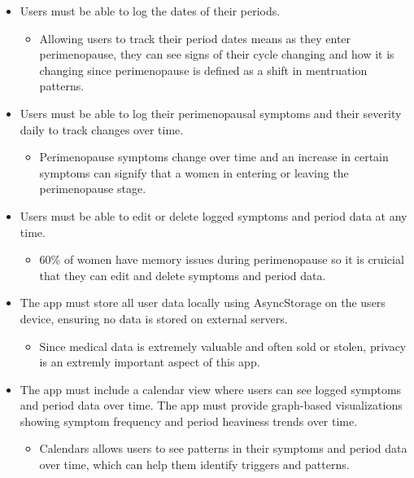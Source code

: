 \begin{itemize}
      \item Users must be able to log the dates of their periods.
        \begin{itemize}
          \item Allowing users to track their period dates means as they enter perimenopause, they can see signs of their cycle changing and how it is changing since perimenopause is defined as a shift in mentruation patterns\cite{Brambilla1994}. 
        \end{itemize}
      \item Users must be able to log their perimenopausal symptoms and their severity daily to track changes over time.
        \begin{itemize}
          \item Perimenopause symptoms change over time and an increase in certain symptoms can signify that a women in entering or leaving the perimenopause stage\cite{Brambilla1994}.
        \end{itemize}
      \item Users must be able to edit or delete logged symptoms and period data at any time.
        \begin{itemize}
          \item 60\% of women have memory issues during perimenopause so it is cruicial that they can edit and delete symptoms and period data\cite{Gilman2021}.
        \end{itemize} 
      \item The app must store all user data locally using AsyncStorage on the users device, ensuring no data is stored on external servers.
        \begin{itemize}
          \item Since medical data is extremely valuable and often sold or stolen, privacy is an extremly important aspect of this app\cite{Gilman2021}\cite{Rosato2020}.
        \end{itemize}
      \item The app must include a calendar view where users can see logged symptoms and period data over time. The app must provide graph-based visualizations showing symptom frequency and period heaviness trends over time.
        \begin{itemize}
          \item Calendars allows users to see patterns in their symptoms and period data over time, which can help them identify triggers and patterns\cite{Brambilla1994}.

\end{itemize}
\end{itemize}
